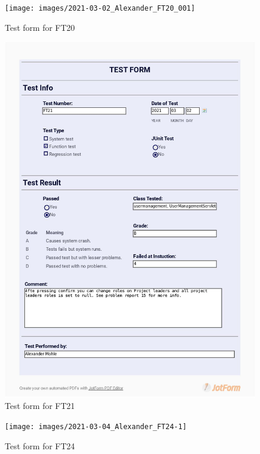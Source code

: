 \documentclass{article}
\begin{document}
 \begin{figure}
     \centering
     \texttt{[image: images/2021-03-02\_Alexander\_FT20\_001]}
     \renewcommand\figurename{Figure}
     \caption{Test form for FT20}
     \label{fig:my_label}
 \end{figure}
 
 \begin{figure}
     \centering
     \includegraphics[width=13cm]{images/2021-03-02_Alexander_FT21_001}
     \renewcommand\figurename{Figure}
     \caption{Test form for FT21}
     \label{fig:my_label}
 \end{figure}
 
 \begin{figure}
     \centering
     \texttt{[image: images/2021-03-04\_Alexander\_FT24-1]}
     \renewcommand\figurename{Figure}
     \caption{Test form for FT24}
     \label{fig:my_label}
 \end{figure}
 
\end{document}
